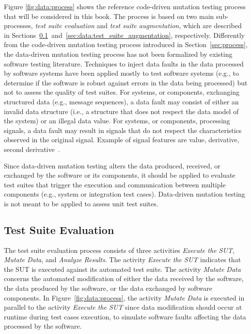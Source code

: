 Figure \ref{fig:data:process} shows the reference code-driven mutation testing process that will be considered in this book. The process is based on two main sub-processes, \emph{test suite evaluation} and \emph{test suite augmentation}, which are described in Sections~\ref{sec:data:test_suite_evaluation}~and~\ref{sec:data:test_suite_augmentation}, respectively. Differently from the code-driven mutation testing process introduced in Section~\ref{sec:process}, the data-driven mutation testing process has not been formalized by existing software testing literature. 
Techniques to inject data faults in the data processed by software systems have been applied mostly to test software systems (e.g., to determine if the software is robust against errors in the data being processed) but not to assess the quality of test suites.
For systems, or components, exchanging structured data (e.g., message sequences), a data fault may consist of either an invalid data structure (i.e., a structure that does not respect the data model of the system) or an illegal data value.
For systems, or components, processing signals, a data fault may result in signals that do not respect the characteristics observed in the original signal. Example of signal features are value, derivative, second derivative~\cite{Matinnejad19}.

Since data-driven mutation testing alters the data produced, received, or exchanged by the software or its components, it should be applied to evaluate test suites that trigger the execution and communication between multiple components (e.g., system or integration test cases). Data-driven mutation testing is not meant to be applied to assess unit test suites.

\subsection{Test Suite Evaluation} %
\label{sec:data:test_suite_evaluation}

The test suite evaluation process consists of three activities \emph{Execute the SUT}, \emph{Mutate Data},  and \emph{Analyze Results}.
The activity \emph{Execute the SUT} indicates that the SUT is executed against its automated test suite. 
The activity \emph{Mutate Data} concerns the automated modification of either the data received by the software, the data produced by the software, or the data exchanged by software components.
In Figure~\ref{fig:data:process}, the activity \emph{Mutate Data} is executed in parallel to the activity \emph{Execute the SUT} since data modification should occur at runtime during test cases execution, to simulate software faults affecting the data processed by the software.


